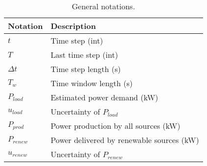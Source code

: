 \begin{table*}[!htb]
\centering
\caption{General notations.}
\label{tab:notation_system}
\begin{tabular}{l|l}
    \hline
    Notation & Description \\\hline\hline
    $t$ & Time step (int)\\
    $T$ & Last time step (int)\\
    $\Delta t$ & Time step length (s)\\
    $T_{w}$ & Time window length (s)\\
    $P_{load}$ & Estimated power demand (kW)\\
    $u_{load}$ & Uncertainty of $P_{load}$\\
    $P_{prod}$ & Power production by all sources (kW)\\
    $P_{renew}$ & Power delivered by renewable sources (kW)\\
    $u_{renew}$ & Uncertainty of $P_{renew}$\\
    \hline
\end{tabular}
\end{table*}
